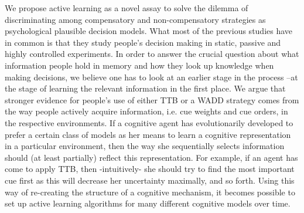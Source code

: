 \documentclass[10pt,letterpaper]{article}
\begin{document}
We propose active learning as a novel assay to solve the dilemma of discriminating among compensatory and non-compensatory strategies as psychological plausible decision models. What most of the previous studies have in common is that they study people’s decision making in static, passive and highly controlled experiments. In order to answer the crucial question about what information people hold in memory and how they look up knowledge when making decisions, we believe one has to look at an earlier stage in the process --at the stage of learning the relevant information in the first place. We argue that stronger evidence for people’s use of either TTB or a WADD strategy comes from the way people actively acquire information, i.e. cue weights and cue orders, in the respective environments. If a cognitive agent has  evolutionarily developed to prefer a certain class of models as her means to learn a cognitive representation in a particular environment, then the way she sequentially selects information should (at least partially) reflect this representation. For example, if an agent has come to apply TTB, then -intuitively- she should try to find the most important cue first as this will decrease her uncertainty maximally, and so forth. Using this way of re-creating the structure of a cognitive mechanism, it becomes possible to set up active learning algorithms for many different cognitive models over time. 
\end{document}
